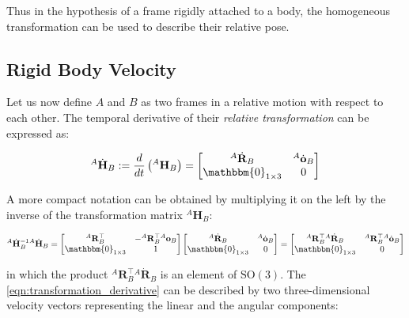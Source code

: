 Thus in the hypothesis of a frame rigidly attached to a body, the homogeneous transformation can be used to describe their relative pose.

\subsection{Rigid Body Velocity}

Let us now define $A$ and $B$ as two frames in a relative motion with respect to each other. The temporal derivative of their \textit{relative transformation} can be expressed as:

\begin{equation}
    \label{eqn:transformation_derivative}
    {}^A\dot{\mathbf{H}}_B := \frac{d}{dt} \left( {}^A\mathbf{H} _B \right) =
    \begin{bmatrix}
        {}^A\dot{\mathbf{R}}_B    & {}^A\dot{\mathbf{o}}_B \\
        \mathbbm{0} _{1 \times 3} & 0
    \end{bmatrix}
\end{equation}

A more compact notation can be obtained by multiplying it on the left by the inverse of the transformation matrix ${}^A\mathbf{H} _B$:

\begin{equation}
    {}^A\dot{\mathbf{H}} _B ^{-1} {}^A\dot{\mathbf{H}} _B =
    \begin{bmatrix}
        {}^A\mathbf{R}_B^\top     & -{}^A\mathbf{R}_B^\top {}^A\mathbf{o}_B \\
        \mathbbm{0} _{1 \times 3} & 1
    \end{bmatrix}
    \begin{bmatrix}
        {}^A\dot{\mathbf{R}}_B    & {}^A\dot{\mathbf{o}}_B \\
        \mathbbm{0} _{1 \times 3} & 0
    \end{bmatrix} =
    \begin{bmatrix}
        {}^A\mathbf{R}_B^\top {}^A\dot{\mathbf{R}}_B & {}^A\mathbf{R}_B^\top {}^A\dot{\mathbf{o}}_B \\
        \mathbbm{0} _{1 \times 3}                    & 0
    \end{bmatrix}
\end{equation}

in which the product ${}^A\mathbf{R}_B^\top {}^A\dot{\mathbf{R}}_B$ is an element of $\mathrm{SO}(3)$. The \cref{eqn:transformation_derivative} can be described by two three-dimensional velocity vectors representing the linear and the angular components:

